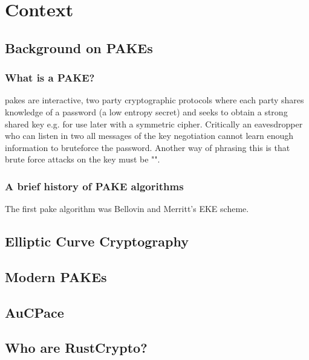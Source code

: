 \chapter{Context}

\section{Background on PAKEs}
\subsection{What is a PAKE?}
\glspl{pake} are interactive, two party cryptographic protocols where each party shares knowledge of a password (a low entropy secret) and seeks to obtain a strong shared key e.g. for use later with a symmetric cipher. Critically an eavesdropper who can listen in two all messages of the key negotiation cannot learn enough information to bruteforce the password. Another way of phrasing this is that brute force attacks on the key must be "".

\subsection{A brief history of PAKE algorithms}
The first \gls{pake} algorithm was Bellovin and Merritt's EKE scheme\cite{eke}.

\section{Elliptic Curve Cryptography}
\section{Modern PAKEs}
\section{AuCPace}
\section{Who are RustCrypto?}

